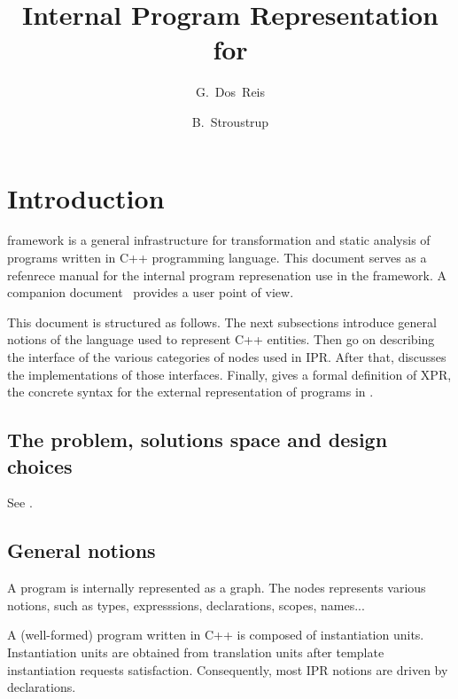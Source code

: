 \documentclass[a4paper,12pt]{article}
\title{Internal Program Representation for \ThePivot}
\author{G.~Dos~Reis \and B.~Stroustrup}
\date{}
\begin{document}
\maketitle

\section{Introduction}
\label{sec:intro}

\ThePivot{} framework is a general infrastructure for transformation and
static analysis of programs written in C++ programming language. This document
serves as a refenrece manual for the internal program represenation use in the 
\ThePivot{} framework.  A companion 
document~\cite{dosreis04:ipr-user-guide} provides a user point of view.


This document is structured as follows. The next subsections introduce general
notions of the language used to represent C++ entities. 
 Then  go on describing the
interface of the various categories of nodes used in IPR. After that,
 discusses the implementations of those interfaces.  Finally,
 gives a formal definition of XPR, the concrete syntax
for the external representation of programs in \ThePivot{}.


\subsection{The problem, solutions space and design choices}
\label{sec:design}

See \cite{stroustrup02:xti, gdr-bs05:cxx-rep}.

\subsection{General notions}
\label{sec:intro:general-notion}

A program is internally represented as a graph.  The nodes represents various
notions, such as types, expresssions, declarations, scopes, names...

A (well-formed) program written in C++ is composed of instantiation units. 
Instantiation units are obtained from translation units after template
instantiation requests satisfaction.  Consequently, most IPR notions are
driven by declarations.
\end{document}
